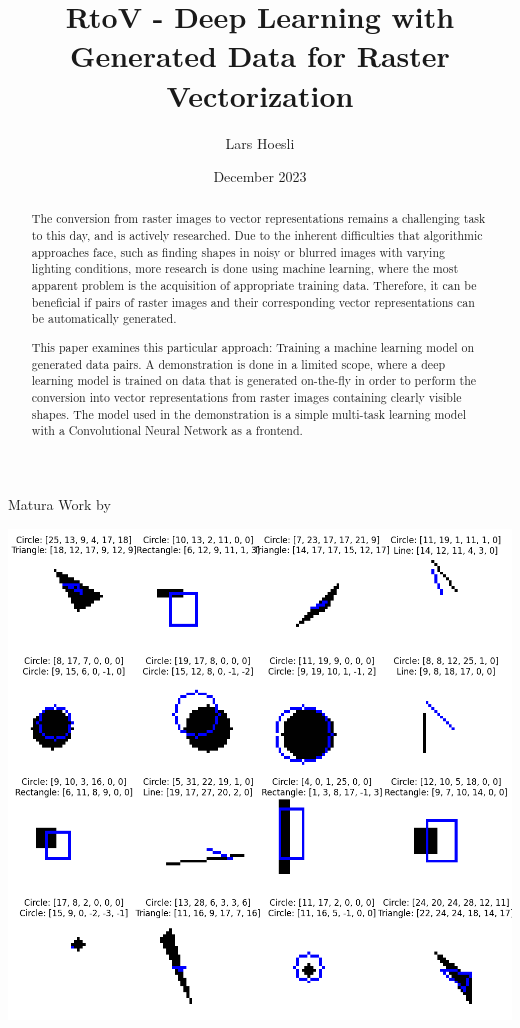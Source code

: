 \documentclass[12pt, a4paper, titlepage]{report}
\title{RtoV - Deep Learning with Generated Data for Raster Vectorization}
\author{Lars Hoesli}
\date{December 2023}
\begin{document}

\begin{titlepage}
    \centering

    \Huge{\textbf{\inserttitle}}
    \par
    \Large{Matura Work by \insertauthor}
    \vspace{1cm}\par
    \large{\insertdate}
    \vspace{2cm}

    \includegraphics[width=1.0\textwidth]{../rc/images/all_shapes_approx_visual1.png}
    \vfill
    \begin{abstract}
       The conversion from raster images to vector representations remains a challenging task to this day, and is actively researched. Due to the inherent difficulties that algorithmic approaches face, such as finding shapes in noisy or blurred images with varying lighting conditions, more research is done using machine learning, where the most apparent problem is the acquisition of appropriate training data. Therefore, it can be beneficial if pairs of raster images and their corresponding vector representations can be automatically generated.

		 This paper examines this particular approach: Training a machine learning model on generated data pairs. A demonstration is done in a limited scope, where a deep learning model is trained on data that is generated on-the-fly in order to perform the conversion into vector representations from raster images containing clearly visible shapes. The model used in the demonstration is a simple multi-task learning model with a Convolutional Neural Network as a frontend.


\end{abstract}
\end{titlepage}
\end{document}

